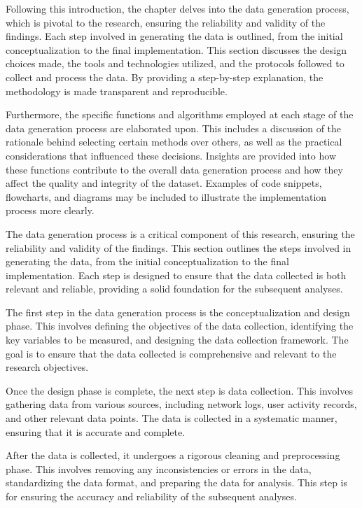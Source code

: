 Following this introduction, the chapter delves into the data generation process, which is pivotal to the research, ensuring the reliability and validity of the findings. Each step involved in generating the data is outlined, from the initial conceptualization to the final implementation. This section discusses the design choices made, the tools and technologies utilized, and the protocols followed to collect and process the data. By providing a step-by-step explanation, the methodology is made transparent and reproducible.

Furthermore, the specific functions and algorithms employed at each stage of the data generation process are elaborated upon. This includes a discussion of the rationale behind selecting certain methods over others, as well as the practical considerations that influenced these decisions. Insights are provided into how these functions contribute to the overall data generation process and how they affect the quality and integrity of the dataset. Examples of code snippets, flowcharts, and diagrams may be included to illustrate the implementation process more clearly.

The data generation process is a critical component of this research, ensuring the reliability and validity of the findings. This section outlines the steps involved in generating the data, from the initial conceptualization to the final implementation. Each step is designed to ensure that the data collected is both relevant and reliable, providing a solid foundation for the subsequent analyses.

The first step in the data generation process is the conceptualization and design phase. This involves defining the objectives of the data collection, identifying the key variables to be measured, and designing the data collection framework. The goal is to ensure that the data collected is comprehensive and relevant to the research objectives.

Once the design phase is complete, the next step is data collection. This involves gathering data from various sources, including network logs, user activity records, and other relevant data points. The data is collected in a systematic manner, ensuring that it is accurate and complete.

After the data is collected, it undergoes a rigorous cleaning and preprocessing phase. This involves removing any inconsistencies or errors in the data, standardizing the data format, and preparing the data for analysis. This step is for ensuring the accuracy and reliability of the subsequent analyses.

